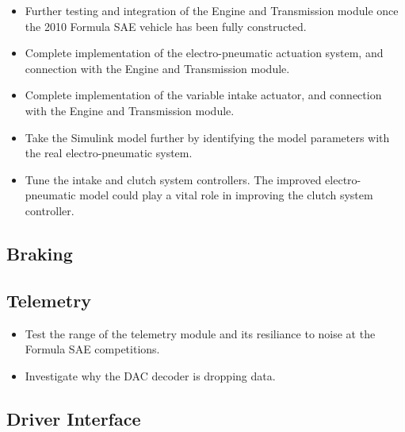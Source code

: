 \begin{itemize}
  \item Further testing and integration of the Engine and Transmission module once the 2010 Formula SAE vehicle has been fully constructed.
  \item Complete implementation of the electro-pneumatic actuation system, and connection with the Engine and Transmission module.
  \item Complete implementation of the variable intake actuator, and connection with the Engine and Transmission module.
  \item Take the Simulink model further by identifying the model parameters with the real electro-pneumatic system.
  \item Tune the intake and clutch system controllers. The improved electro-pneumatic model could play a vital role in improving the clutch system controller.
\end{itemize}

\subsection{Braking}

\subsection{Telemetry}

\begin{itemize}
  \item Test the range of the telemetry module and its resiliance to noise at the Formula SAE competitions.
  \item Investigate why the DAC decoder is dropping data.
\end{itemize}

\subsection{Driver Interface}
